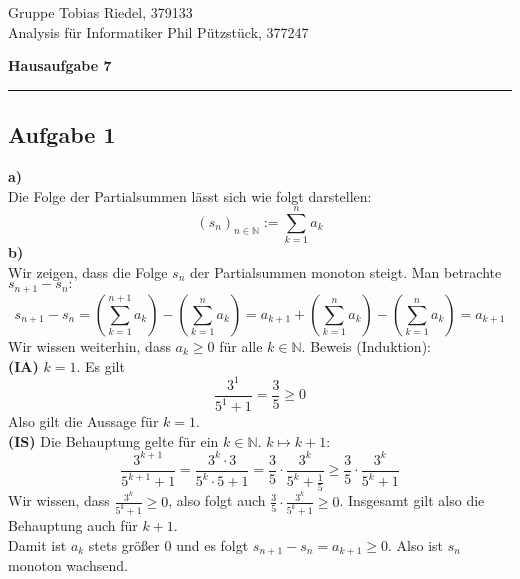 \documentclass[a4paper,graphics,11pt]{article}
\newcommand{\aufgabe}[1]{\subsection*{Aufgabe #1}}
\begin{document}
\noindent Gruppe              \hfill Tobias Riedel, 379133 \\
\noindent Analysis für Informatiker             \hfill Phil Pützstück, 377247 \\

\begin{center}
	\LARGE{\textbf{Hausaufgabe 7}}
\end{center}
\begin{center}
\rule[0.1ex]{\textwidth}{1pt}
\end{center}



\aufgabe{1}
\textbf{a)}\\[5pt]
Die Folge der Partialsummen lässt sich wie folgt darstellen:
$$
    (s_n)_{n\in \mathbb{N}} := \sum_{k=1}^{n} a_k
$$
\textbf{b)}\\[5pt]
Wir zeigen, dass die Folge $s_n$ der Partialsummen monoton steigt.
Man betrachte $s_{n+1}-s_n\colon$
$$
    s_{n+1} - s_n = \left(\sum_{k=1}^{n+1} a_k\right) - \left(\sum_{k=1}^{n} a_k\right)
    = a_{k+1} + \left(\sum_{k=1}^{n} a_k\right) -\left(\sum_{k=1}^{n} a_k\right)
    = a_{k+1}
$$
Wir wissen weiterhin, dass $a_k \geq 0$ für alle $k \in \mathbb{N}$. Beweis (Induktion):\\
\textbf{(IA)} $k=1$. Es gilt 
$$
    \frac{3^1}{5^1+1} = \frac{3}{5} \geq 0
$$
Also gilt die Aussage für $k=1$.\\
\textbf{(IS)} Die Behauptung gelte für ein $k \in \mathbb{N}$. $k\mapsto k+1\colon$
$$
    \frac{3^{k+1}}{5^{k+1}+1} = \frac{3^k\cdot3}{5^k\cdot5+1}
    = \frac{3}{5}\cdot \frac{3^k}{5^k+\frac{1}{5}}
    \geq \frac{3}{5}\cdot \frac{3^k}{5^k+1}
$$
Wir wissen, dass $\displaystyle\frac{3^k}{5^k+1}\geq 0$, also folgt auch
$\displaystyle\frac{3}{5} \cdot \frac{3^k}{5^k+1} \geq 0$.
Insgesamt gilt also die Behauptung auch für $k+1$.\\
Damit ist $a_k$ stets größer 0 und es folgt $s_{n+1}-s_n = a_{k+1} \geq 0$. Also
ist $s_n$ monoton wachsend.
\end{document}
